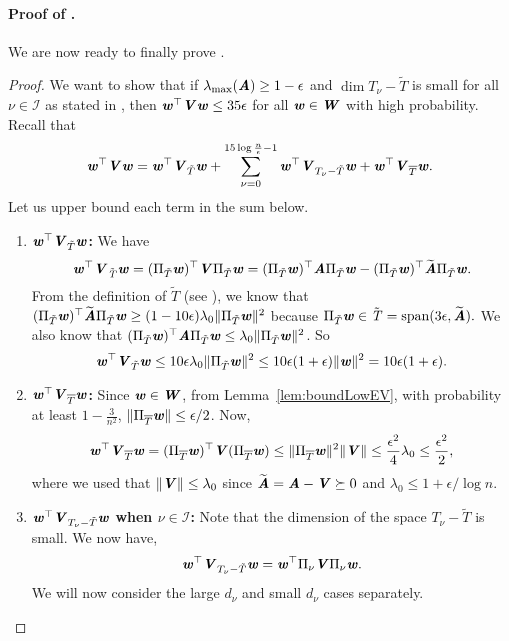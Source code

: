 %
\paragraph{Proof of .}
 We are now ready to finally prove .

\begin{proof}

We want to show that if $\lambda_{\max}(\AA)\geq 1- \epsilon$ and $\dim{T_{\nu}-\tilde{T}}$ is small for all $\nu\in \mathcal{I}$ as stated in , then $\ww^{\top}\VV\ww\leq 35 \epsilon$ for all $\ww\in \WW$ with high probability. Recall that
\[
\ww^{\top}\VV\ww = \ww^{\top}\VV_{\tilde{T}}\ww+\sum_{\nu = 0}^{15\log\frac{n}{\epsilon}-1}\ww^{\top}\VV_{T_{\nu} -\tilde{T}}\ww+ \ww^{\top}\VV_{\overline{T}}\ww.
\]
Let us upper bound each term in the sum below.
\begin{enumerate}
    
    \item \textbf{$\ww^\top\VV_{\tilde{T}}\ww$:} 
    We have 
    \[
        \ww^\top \VV_{\Ttil} \ww = (\Pi_{\tilde{T}}\ww)^{\top}\VV\Pi_{\tilde{T}}\ww =
        (\Pi_{\tilde{T}}\ww)^{\top}\AA\Pi_{\tilde{T}}\ww - (\Pi_{\tilde{T}}\ww)^{\top}\AAtil\Pi_{\tilde{T}}\ww. 
    \]
    From the definition of $\tilde{T}$ (see ), we know that $(\Pi_{\tilde{T}}\ww)^{\top}\AAtil\Pi_{\tilde{T}}\ww \geq \left(1-10\epsilon\right)\lambda_0\|\Pi_{\tilde{T}}\ww\|^2 $ because $\Pi_{\tilde{T}}\ww \in \Ttil = \Span(3\eps,\AAtil).$
    We also know that $(\Pi_{\tilde{T}}\ww)^{\top}\AA\Pi_{\tilde{T}}\ww \leq \lambda_0 \|\Pi_{\tilde{T}}\ww\|^2$. So 
    \begin{equation}\label{eq:V2}
    \ww^{\top}\VV_{\tilde{T}}\ww \leq 10\epsilon\lambda_0 \|\Pi_{\tilde{T}}\ww\|^2\leq 10\epsilon(1+\epsilon)\|\ww\|^2 =10\epsilon (1+\epsilon).
  \end{equation}
\item \textbf{$\ww^\top\VV_{\overline{T}}\ww$:} Since $\ww\in \WW$, from Lemma~\ref{lem:boundLowEV}, with probability at least $1-\frac{3}{n^2}$, $\|\Pi_{\overline{T}}\ww\|\leq \epsilon/2$. Now, 
    \begin{equation}\label{eq:V1}
        \ww^{\top}\VV_{\overline{T}}\ww = (\Pi_{\overline{T}}\ww)^{\top}\VV(\Pi_{\overline{T}}\ww)\leq \|\Pi_{\overline{T}}\ww\|^2\|\VV\| \leq \frac{\epsilon^2}{4}\lambda_0 \leq \frac{\epsilon^2}{2},
    \end{equation}
    where we used that $\|\VV\|\leq \lambda_0$ since $\AAtil = \AA-\VV \succeq 0$ and $\lambda_0\leq 1+\epsilon/\log n$.
    \item \textbf{$\ww^\top\VV_{T_{\nu} -\tilde{T}}\ww$ when $\nu \in \mathcal{I}$:} Note that the dimension of the space $T_{\nu} -\tilde{T}$ is small. We now have,
    \[
    \ww^{\top}\VV_{T_{\nu} -\tilde{T}}\ww = \ww^{\top}\Pi_{\nu}\VV\Pi_{\nu}\ww.
    \]
    We will now consider the large $d_{\nu}$ and small $d_{\nu}$ cases separately.

\end{enumerate}
\end{proof}
